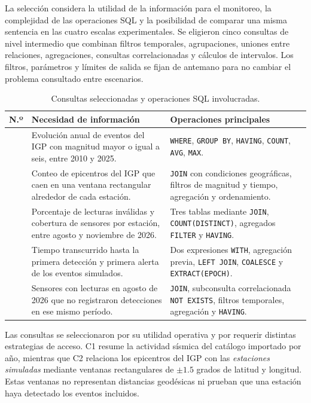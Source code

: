 \documentclass[12pt,a4paper]{article}
\begin{document}
La selección considera la utilidad de la información para el
monitoreo, la complejidad de las operaciones SQL y la posibilidad de
comparar una misma sentencia en las cuatro escalas experimentales.
Se eligieron cinco consultas de nivel intermedio que combinan
filtros temporales, agrupaciones, uniones entre relaciones,
agregaciones, consultas correlacionadas y cálculos de intervalos.
Los filtros, parámetros y límites de salida se fijan de antemano
para no cambiar el problema consultado entre escenarios.

\begin{table}[H]
\centering
\small
\begin{tabular}{>{\raggedright\arraybackslash}p{1.1cm}>{\raggedright\arraybackslash}p{6.05cm}>{\raggedright\arraybackslash}p{6.9cm}}
\toprule
\textbf{N.º} & \textbf{Necesidad de información} & \textbf{Operaciones principales} \\
\midrule
1 & Evolución anual de eventos del IGP con magnitud mayor o igual a seis, entre 2010 y 2025. & \texttt{WHERE}, \texttt{GROUP BY}, \texttt{HAVING}, \texttt{COUNT}, \texttt{AVG}, \texttt{MAX}. \\
2 & Conteo de epicentros del IGP que caen en una ventana rectangular alrededor de cada estación. & \texttt{JOIN} con condiciones geográficas, filtros de magnitud y tiempo, agregación y ordenamiento. \\
3 & Porcentaje de lecturas inválidas y cobertura de sensores por estación, entre agosto y noviembre de 2026. & Tres tablas mediante \texttt{JOIN}, \texttt{COUNT(DISTINCT)}, agregados \texttt{FILTER} y \texttt{HAVING}. \\
4 & Tiempo transcurrido hasta la primera detección y primera alerta de los eventos simulados. & Dos expresiones \texttt{WITH}, agregación previa, \texttt{LEFT JOIN}, \texttt{COALESCE} y \texttt{EXTRACT(EPOCH)}. \\
5 & Sensores con lecturas en agosto de 2026 que no registraron detecciones en ese mismo período. & \texttt{JOIN}, subconsulta correlacionada \texttt{NOT EXISTS}, filtros temporales, agregación y \texttt{HAVING}. \\
\bottomrule
\end{tabular}
\caption{Consultas seleccionadas y operaciones SQL involucradas.}
\label{tab:consultas-seleccionadas-51}
\end{table}

Las consultas se seleccionaron por su utilidad operativa y por
requerir distintas estrategias de acceso. C1 resume la actividad
sísmica del catálogo importado por año, mientras que C2 relaciona
los epicentros del IGP con las \emph{estaciones simuladas} mediante
ventanas rectangulares de \(\pm 1.5\) grados de latitud y longitud.
Estas ventanas no representan distancias geodésicas ni prueban que
una estación haya detectado los eventos incluidos.
\end{document}
